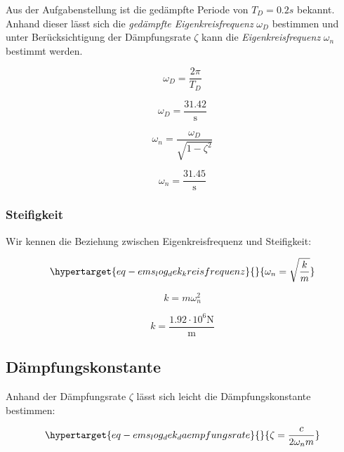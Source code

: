 \documentclass[
  letterpaper,
  DIV=11]{scrreprt}
\begin{document}
Aus der Aufgabenstellung ist die gedämpfte Periode von \(T_D = 0.2 s\)
bekannt. Anhand dieser lässt sich die \emph{gedämpfte
Eigenkreisfrequenz} \(\omega_D\) bestimmen und unter Berücksichtigung
der Dämpfungsrate \(\zeta\) kann die \emph{Eigenkreisfrequenz}
\(\omega_n\) bestimmt werden.

\begin{equation}\omega_{D} = \frac{2 \pi}{T_{D}}\end{equation}

\begin{equation}\omega_{D} = \frac{31.42}{\text{s}}\end{equation}

\begin{equation}\omega_{n} = \frac{\omega_{D}}{\sqrt{1 - \zeta_{}^{2}}}\end{equation}

\begin{equation}\omega_{n} = \frac{31.45}{\text{s}}\end{equation}

\hypertarget{steifigkeit}{%
\subsubsection{Steifigkeit}\label{steifigkeit}}

Wir kennen die Beziehung zwischen Eigenkreisfrequenz und Steifigkeit:

\begin{equation}\protect\hypertarget{eq-ems_log_dek_kreisfrequenz}{}{
\omega_n = \sqrt{\frac{k}{m}}
}\label{eq-ems_log_dek_kreisfrequenz}\end{equation}

\begin{equation}k = m \omega_{n}^{2}\end{equation}

\begin{equation}k = \frac{1.92 \cdot 10^{6} \text{N}}{\text{m}}\end{equation}

\hypertarget{duxe4mpfungskonstante}{%
\subsection{Dämpfungskonstante}\label{duxe4mpfungskonstante}}

Anhand der Dämpfungsrate \(\zeta\) lässt sich leicht die
Dämpfungskonstante bestimmen:

\begin{equation}\protect\hypertarget{eq-ems_log_dek_daempfungsrate}{}{
\zeta = \frac{c}{2\omega_nm}
}\label{eq-ems_log_dek_daempfungsrate}\end{equation}
\end{document}
